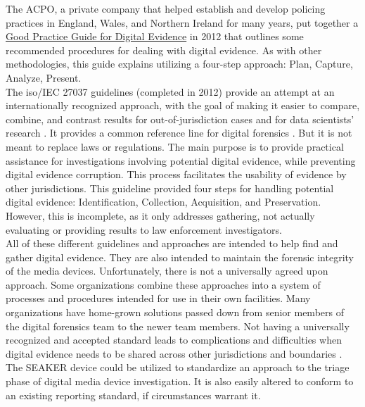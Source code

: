 \documentclass[12pt]{article}
\begin{document}
The ACPO, a private company that helped establish and
develop policing practices in England, Wales, and Northern Ireland for many years,
put together a \uline{Good Practice Guide for Digital Evidence} \cite{williams2012acpo} in 2012 that outlines some
recommended procedures for dealing with digital evidence.  As with other methodologies, this guide
explains utilizing a four-step approach: Plan, Capture, Analyze, Present.\\

The \gls{iso}/IEC 27037 guidelines (completed in 2012) provide an attempt at an internationally 
recognized approach,
with the goal of making it easier to compare, combine, and contrast
results for out-of-jurisdiction cases and for data scientists' research \cite{ISO27037}.  It provides a
common reference line for 
digital forensics \cite{ajijola2014review}.  But it is not meant to replace laws or regulations.
The main purpose is to provide practical
assistance for investigations involving potential digital evidence, while preventing digital
evidence corruption.  This
process facilitates the usability of evidence by other jurisdictions.  This guideline provided
four steps for handling
potential digital evidence: Identification, Collection, Acquisition, and Preservation.  However,
this is incomplete, as
it only addresses gathering, not actually evaluating or providing results to law enforcement
investigators.\\

All of these different guidelines and approaches are intended to help find and gather digital evidence.
They are also intended to maintain the forensic integrity of the media devices.  Unfortunately, there 
is not a universally agreed upon approach. Some organizations combine these approaches
into a system of processes and procedures intended for use in their own facilities.  
Many organizations have home-grown solutions passed down from senior members of the digital forensics
team to the newer team members.  Not having a universally recognized and accepted standard 
leads to complications and difficulties when digital evidence needs to be shared across other
jurisdictions and boundaries \cite{ajijola2014review}.\\

The SEAKER device could be utilized to standardize an approach to the triage phase of 
digital media device investigation.  It is also easily altered to conform to an existing reporting
standard, if circumstances warrant it.\\
\end{document}
